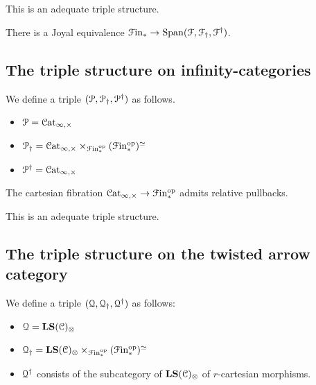 \documentclass[main.tex]{subfiles}
\begin{document}
\begin{proposition}
  This is an adequate triple structure.
\end{proposition}

\begin{proposition}
  There is a Joyal equivalence $\mathcal{F}\mathrm{in}_{*} \to \mathrm{Span}(\mathcal{F}, \mathcal{F}_{\dagger}, \mathcal{F}^{\dagger})$.
\end{proposition}

\subsection{The triple structure on infinity-categories}
\label{ssc:the_triple_structure_on_categories}

We define a triple $(\mathcal{P}, \mathcal{P}_{\dagger}, \mathcal{P}^{\dagger})$ as follows.
\begin{itemize}
  \item $\mathcal{P} = \mathcal{C}\mathrm{at}_{\infty,\times}$

  \item $\mathcal{P}_{\dagger} = \mathcal{C}\mathrm{at}_{\infty,\times} \times_{\mathcal{F}\mathrm{in}_{*}^{\mathrm{op}}}(\mathcal{F}\mathrm{in}_{*}^{\mathrm{op}})^{\simeq}$

  \item $\mathcal{P}^{\dagger} = \mathcal{C}\mathrm{at}_{\infty,\times}$
\end{itemize}

\begin{proposition}
  The cartesian fibration $\mathcal{C}\mathrm{at}_{\infty,\times} \to \mathcal{F}\mathrm{in}_{*}^{\mathrm{op}}$ admits relative pullbacks.
\end{proposition}

\begin{proposition}
  This is an adequate triple structure.
\end{proposition}

\subsection{The triple structure on the twisted arrow category}
\label{ssc:the_triple_structure_on_the_twisted_arrow_category}

We define a triple $(\mathcal{Q}, \mathcal{Q}_{\dagger}, \mathcal{Q}^{\dagger})$ as follows:
\begin{itemize}
  \item $\mathcal{Q} = \mathbf{LS}(\mathcal{C})_{\otimes}$

  \item $\mathcal{Q}_{\dagger} = \mathbf{LS}(\mathcal{C})_{\otimes} \times_{\mathcal{F}\mathrm{in}_{*}^{\mathrm{op}}}(\mathcal{F}\mathrm{in}_{*}^{\mathrm{op}})^{\simeq}$

  \item $\mathcal{Q}^{\dagger}$ consists of the subcategory of $\mathbf{LS}(\mathcal{C})_{\otimes}$ of $r$-cartesian morphisms.
\end{itemize}
\end{document}
